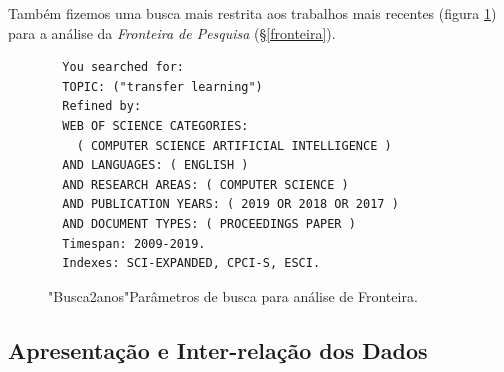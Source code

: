 \documentclass[sigconf]{acmart}
\begin{document}
Também fizemos uma busca mais restrita aos trabalhos mais recentes (figura \ref{card:sota}) para a análise da \emph{Fronteira de Pesquisa} (\S \ref{fronteira}).
\begin{figure}[htp]
  \begin{tcolorbox}[colback=yellow!5!white,colframe=gray!75!black,title={Results: 384 (from Web of Science Core Collection)}]
    \footnotesize{
  \begin{verbatim}
  You searched for: 
  TOPIC: ("transfer learning")
  Refined by: 
  WEB OF SCIENCE CATEGORIES: 
    ( COMPUTER SCIENCE ARTIFICIAL INTELLIGENCE )
  AND LANGUAGES: ( ENGLISH ) 
  AND RESEARCH AREAS: ( COMPUTER SCIENCE )
  AND PUBLICATION YEARS: ( 2019 OR 2018 OR 2017 )
  AND DOCUMENT TYPES: ( PROCEEDINGS PAPER )
  Timespan: 2009-2019. 
  Indexes: SCI-EXPANDED, CPCI-S, ESCI.
  \end{verbatim}
    }
  
  \end{tcolorbox}
  \caption{"Busca2anos"Parâmetros de busca para análise de Fronteira.}
  \label{card:sota}
\end{figure}

\subsection{Apresentação e Inter-relação dos Dados}

\end{document}
